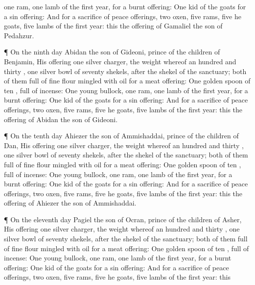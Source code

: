 {one
ram,
one
lamb of the
first
year, for a burnt
offering:
One
kid of the
goats for a sin
offering:
And for a
sacrifice of peace
offerings,
two
oxen,
five
rams,
five he
goats,
five
lambs of the
first
year: this
{} the
offering of
Gamaliel the
son of
Pedahzur.
\par }{\PP {}¶ On the
ninth
day
Abidan the
son of
Gideoni,
prince of the
children of
Benjamin,
{}
His
offering
{}
one
silver
charger, the
weight whereof
{} an
hundred and
thirty
{},
one
silver
bowl of
seventy
shekels, after the
shekel of the
sanctuary;
both of them
full of fine
flour
mingled with
oil for a meat
offering:
One
golden
spoon of
ten
{},
full of
incense:
One
young
bullock,
one
ram,
one
lamb of the
first
year, for a burnt
offering:
One
kid of the
goats for a sin
offering:
And for a
sacrifice of peace
offerings,
two
oxen,
five
rams,
five he
goats,
five
lambs of the
first
year: this
{} the
offering of
Abidan the
son of
Gideoni.
\par }{\PP {}¶ On the
tenth
day
Ahiezer the
son of
Ammishaddai,
prince of the
children of
Dan,
{}
His
offering
{}
one
silver
charger, the
weight whereof
{} an
hundred and
thirty
{},
one
silver
bowl of
seventy
shekels, after the
shekel of the
sanctuary;
both of them
full of fine
flour
mingled with
oil for a meat
offering:
One
golden
spoon of
ten
{},
full of
incense:
One
young
bullock,
one
ram,
one
lamb of the
first
year, for a burnt
offering:
One
kid of the
goats for a sin
offering:
And for a
sacrifice of peace
offerings,
two
oxen,
five
rams,
five he
goats,
five
lambs of the
first
year: this
{} the
offering of
Ahiezer the
son of
Ammishaddai.
\par }{\PP {}¶ On the
eleventh
day
Pagiel the
son of
Ocran,
prince of the
children of
Asher,
{}
His
offering
{}
one
silver
charger, the
weight whereof
{} an
hundred and
thirty
{},
one
silver
bowl of
seventy
shekels, after the
shekel of the
sanctuary;
both of them
full of fine
flour
mingled with
oil for a meat
offering:
One
golden
spoon of
ten
{},
full of
incense:
One
young
bullock,
one
ram,
one
lamb of the
first
year, for a burnt
offering:
One
kid of the
goats for a sin
offering:
And for a
sacrifice of peace
offerings,
two
oxen,
five
rams,
five he
goats,
five
lambs of the
first
year: this
}
